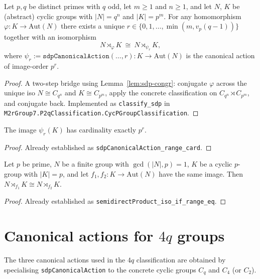 \begin{theorem}
    \label{thm:classify-sdp}
    Let $p, q$ be distinct primes with $q$ odd, let $m \geq 1$ and $n \geq 1$,
    and let $N$, $K$ be (abstract) cyclic groups with $|N| = q^n$ and
    $|K| = p^m$. For any homomorphism $\varphi : K \to \mathrm{Aut}(N)$ there
    exists a unique $r \in \{0, 1, \dots, \min(m, v_p(q-1))\}$ together with an
    isomorphism
    \[
        N \rtimes_\varphi K \ \cong\ N \rtimes_{\psi_r} K,
    \]
    where $\psi_r := \mathtt{sdpCanonicalAction}(\dots, r) : K \to
    \mathrm{Aut}(N)$ is the canonical action of image-order $p^r$.
\end{theorem}
\begin{proof}
    A two-step bridge using Lemma~\ref{lem:sdp-congr}: conjugate $\varphi$
    across the unique iso $N \cong C_{q^n}$ and $K \cong C_{p^m}$, apply the
    concrete classification on $C_{q^n} \rtimes C_{p^m}$, and conjugate back.
    Implemented as \texttt{classify\_sdp} in
    \texttt{M2rGroup7.P2qClassification.CycPGroupClassification}.
\end{proof}

\begin{lemma}
    \label{lem:sdp-canonical-range}
    The image $\psi_r(K)$ has cardinality exactly $p^r$.
\end{lemma}
\begin{proof}
    Already established as \texttt{sdpCanonicalAction\_range\_card}.
\end{proof}

\begin{lemma}
    \label{lem:sdp-iso-range-eq}
    Let $p$ be prime, $N$ be a finite group with $\gcd(|N|, p) = 1$, $K$ be a
    cyclic $p$-group with $|K| = p$, and let
    $f_1, f_2 : K \to \mathrm{Aut}(N)$ have the same image. Then
    $N \rtimes_{f_1} K \cong N \rtimes_{f_2} K$.
\end{lemma}
\begin{proof}
    Already established as \texttt{semidirectProduct\_iso\_if\_range\_eq}.
\end{proof}

\section{Canonical actions for $4q$ groups}

The three canonical actions used in the $4q$ classification are obtained by
specialising \texttt{sdpCanonicalAction} to the concrete cyclic groups
$C_q$ and $C_4$ (or $C_2$).

